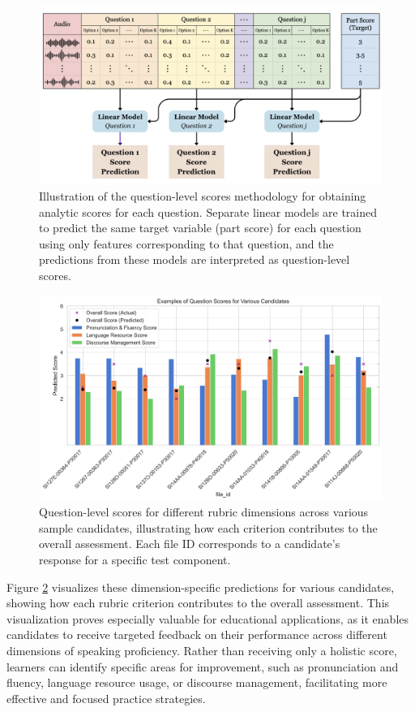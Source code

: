 \documentclass{report}
\begin{document}
\begin{figure}[h]
  \centering
  \includegraphics[width=1\linewidth]{images/question_scores_schematic.png}
  \caption{Illustration of the question-level scores methodology for obtaining analytic scores for each question. Separate linear models are trained to predict the same target variable (part score) for each question using only features corresponding to that question, and the predictions from these models are interpreted as question-level scores.}
  \label{fig:question_level_methodology}
\end{figure}

\begin{figure}[h]
  \centering
  \includegraphics[width=1\linewidth]{images/question_score_examples.png}
  \caption{Question-level scores for different rubric dimensions across various sample candidates, illustrating how each criterion contributes to the overall assessment. Each file ID corresponds to a candidate's response for a specific test component.}
  \label{fig:analytic_scores}
\end{figure}

Figure \ref{fig:analytic_scores} visualizes these dimension-specific predictions for various candidates, showing how each rubric criterion contributes to the overall assessment. This visualization proves especially valuable for educational applications, as it enables candidates to receive targeted feedback on their performance across different dimensions of speaking proficiency. Rather than receiving only a holistic score, learners can identify specific areas for improvement, such as pronunciation and fluency, language resource usage, or discourse management, facilitating more effective and focused practice strategies.
\end{document}
